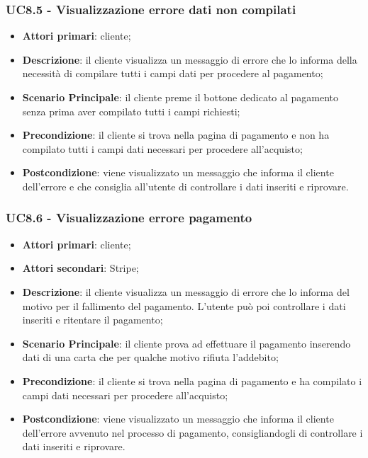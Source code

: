 \subsubsection{UC8.5 - Visualizzazione errore dati non compilati}
\begin{itemize}
\item \textbf{Attori primari}: cliente;
\item \textbf{Descrizione}: il cliente visualizza un messaggio di errore che lo informa della necessità di compilare tutti i campi dati per procedere al pagamento;
\item \textbf{Scenario Principale}: il cliente preme il bottone dedicato al pagamento senza prima aver compilato tutti i campi richiesti;
\item \textbf{Precondizione}: il cliente si trova nella pagina di pagamento e non ha compilato tutti i campi dati necessari per procedere all'acquisto;
\item \textbf{Postcondizione}: viene visualizzato un messaggio che informa il cliente dell'errore e che consiglia all'utente di controllare i dati inseriti e riprovare.
\end{itemize}

\subsubsection{UC8.6 - Visualizzazione errore pagamento}
\begin{itemize}
\item \textbf{Attori primari}: cliente;
\item \textbf{Attori secondari}: Stripe;
\item \textbf{Descrizione}: il cliente visualizza un messaggio di errore che lo informa del motivo per il fallimento del pagamento. L'utente può poi controllare i dati inseriti e ritentare il pagamento;
\item \textbf{Scenario Principale}: il cliente prova ad effettuare il pagamento inserendo dati di una carta che per qualche motivo rifiuta l'addebito;
\item \textbf{Precondizione}: il cliente si trova nella pagina di pagamento e ha compilato i campi dati necessari per procedere all'acquisto;
\item \textbf{Postcondizione}: viene visualizzato un messaggio che informa il cliente dell'errore avvenuto nel processo di pagamento, consigliandogli di controllare i dati inseriti e riprovare.
\end{itemize}


